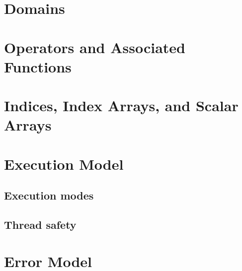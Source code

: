 \section{Domains}


\section{Operators and Associated Functions}


\section{Indices, Index Arrays, and Scalar Arrays}


\section{Execution Model}

\subsection{Execution modes}

\subsection{Thread safety}
\label{Sec:ThreadSafety}


\section{Error Model}
\label{Sec:ErrorModel}
